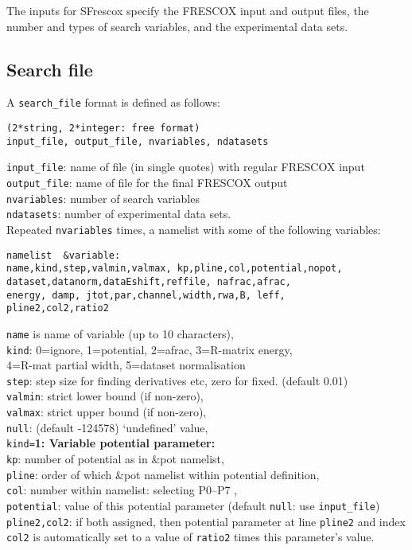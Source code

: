 \documentclass[11pt]{article}
\begin{document}
The inputs for {\sc SFrescox} specify the FRESCOX input and output files,
the number and types of search variables, and the experimental data sets.

\subsection{Search file}
A {\tt search\_file} format is defined as follows:
\begin{verbatim}
(2*string, 2*integer: free format)
input_file, output_file, nvariables, ndatasets
\end{verbatim}
\smallskip

{\tt input\_file}: name of file (in single quotes) with regular FRESCOX input\\
{\tt output\_file}: name of file for the final FRESCOX output\\
{\tt nvariables}: number of search variables\\
{\tt ndatasets}:  number of experimental data sets.\\

Repeated {\tt nvariables} times, a namelist with some of the following variables:
\begin{verbatim}
namelist  &variable:
name,kind,step,valmin,valmax, kp,pline,col,potential,nopot,
dataset,datanorm,dataEshift,reffile, nafrac,afrac,
energy, damp, jtot,par,channel,width,rwa,B, leff,
pline2,col2,ratio2
\end{verbatim}
{\tt name} is name of variable (up to 10 characters),\\
{\tt kind}: 0=ignore, 1=potential, 2=afrac, 3=R-matrix energy,\\
   \hspace*{10mm} 4=R-mat partial width, 5=dataset normalisation\\
{\tt step}: step size for finding derivatives etc, zero for fixed. (default 0.01)\\
{\tt valmin}: strict lower bound (if non-zero),\\
{\tt valmax}: strict upper bound (if non-zero), \\
{\tt null}: (default -124578) `undefined' value,\\

{\tt kind=}{\bf 1: Variable potential parameter:}\\
{\tt kp}: number of potential as in \&pot namelist,\\
{\tt pline}: order of which \&pot namelist within potential definition,\\
{\tt col}:   number within namelist: selecting P0--P7 ,\\
{\tt potential}: value of this potential parameter (default {\tt null}: use {\tt input\_file})\\
{\tt pline2,col2}: if both assigned, then potential parameter at line {\tt pline2} and index {\tt col2} is automatically set to 
a value of {\tt ratio2} times this parameter's value. \\
\end{document}
